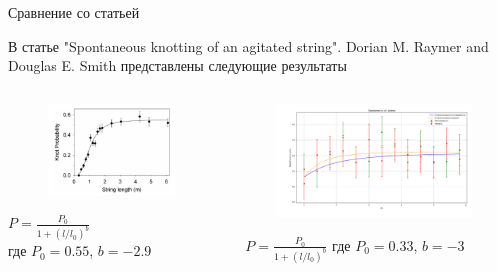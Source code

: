 \begin{frame}{Сравнение со статьей}

	\begin{block}{}
		В статье "Spontaneous knotting of an agitated string". Dorian M. Raymer and Douglas E. Smith представлены следующие результаты
	\end{block}

	\begin{columns}

		\begin{column}{0.4\linewidth}
			\begin{figure}[H]
				\includegraphics[width=1\linewidth]{img/knot_prob.png}
			\end{figure}
			$P = \frac{P_0}{1+(l/l_0)^b}$
			\\где $P_0 = 0.55$, $b = -2.9$
		\end{column}

		\begin{column}{0.6\linewidth}
			\begin{figure}[H]
				\includegraphics[width=1\linewidth]{img/both_7_er.png}
			\end{figure}
			$\, \, \, \, P = \frac{P_0}{1+(l/l_0)^b}$
			где $P_0 = 0.33$, $b = -3$
		\end{column}


	\end{columns}

\end{frame}

